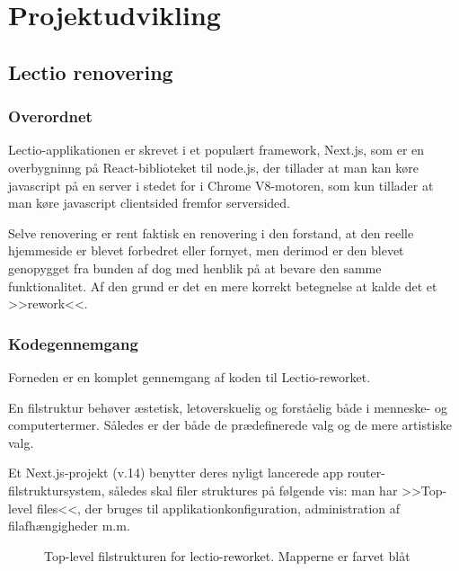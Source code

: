 \section{Projektudvikling \label{sec:Projektudvikling}}
    \subsection{Lectio renovering}
        \subsubsection{Overordnet}
           Lectio-applikationen er skrevet i et populært framework, Next.js, som er en overbygninng på React-biblioteket til node.js, der tillader at man kan køre javascript på en server i stedet for i Chrome V8-motoren, som kun tillader at man køre javascript clientsided fremfor serversided.

           Selve renovering er rent faktisk en renovering i den forstand, 
           at den reelle hjemmeside er blevet forbedret eller fornyet, 
           men derimod er den blevet genopygget fra bunden af dog med henblik på at bevare den samme funktionalitet. 
           Af den grund er det en mere korrekt betegnelse at kalde det et >>rework<<.
        \subsubsection{Kodegennemgang}
        Forneden er en komplet gennemgang af koden til Lectio-reworket.       

        En filstruktur behøver æstetisk, letoverskuelig og forståelig både i menneske- og computertermer.
        Således er der både de prædefinerede valg og de mere artistiske valg. 

        Et Next.js-projekt (v.14) benytter deres nyligt lancerede app router-filstruktursystem, således skal filer struktures på følgende vis: man har >>Top-level files<<, der bruges til applikationkonfiguration, administration af filafhængigheder m.m.\cite{projstruct}
        \begin{figure}[H]
        \caption{Top-level filstrukturen for lectio-reworket. Mapperne er farvet blåt}
        \label{fig:tlprojstruct}
        \end{figure}

